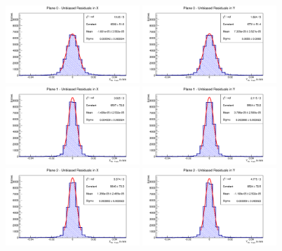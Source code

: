 \begin{figure}[hbtp]
\centering
\includegraphics[width=0.45\textwidth]{figures/resis_upstream/0x.pdf}
\includegraphics[width=0.45\textwidth]{figures/resis_upstream/0y.pdf}
\includegraphics[width=0.45\textwidth]{figures/resis_upstream/1x.pdf}
\includegraphics[width=0.45\textwidth]{figures/resis_upstream/1y.pdf}
\includegraphics[width=0.45\textwidth]{figures/resis_upstream/2x.pdf}
\includegraphics[width=0.45\textwidth]{figures/resis_upstream/2y.pdf}

\end{figure}
